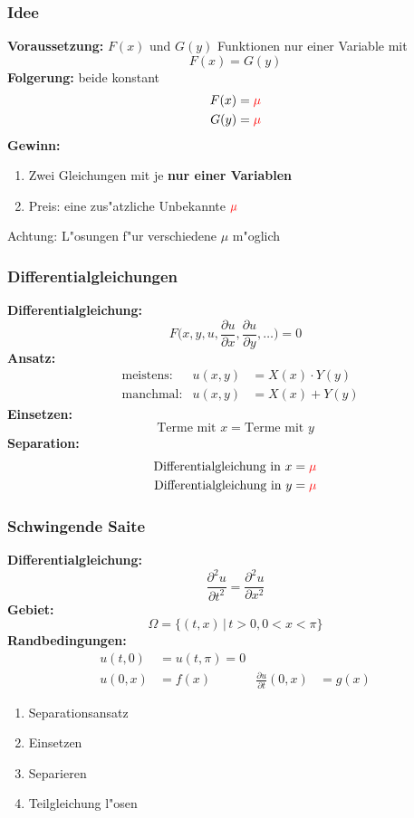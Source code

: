 \begin{frame}
\frametitle{Idee}
{\bf Voraussetzung:}
$F(x)$ und $G(y)$ Funktionen nur einer Variable mit
\[
F(x)=G(y)
\]
\pause
{\bf Folgerung:} beide konstant
\begin{align*}
F(x)&=\color{red}\mu\\
G(y)&=\color{red}\mu
\end{align*}
\pause
{\bf Gewinn:}
\begin{enumerate}
\item Zwei Gleichungen mit je {\bf nur einer Variablen}
\item Preis: eine zus"atzliche Unbekannte $\color{red}\mu$
\end{enumerate}
\pause
Achtung: L"osungen f"ur verschiedene $\mu$ m"oglich
\end{frame}

\begin{frame}
\frametitle{Differentialgleichungen}
{\bf Differentialgleichung:}
\[
F\biggl(x, y, u,
\frac{\partial u}{\partial x},
\frac{\partial u}{\partial y},\dots\biggr)=0
\]
\pause
{\bf Ansatz:}
\begin{align*}
&\text{meistens:}&
u(x,y)&=X(x)\cdot Y(y)\\
&\text{manchmal:}&
u(x,y)&=X(x) + Y(y)
\end{align*}
\pause
{\bf Einsetzen:}
\[
\text{Terme mit $x$} = \text{Terme mit $y$}
\]
\pause
{\bf Separation:}
\begin{align*}
\text{Differentialgleichung in $x$}&= \color{red}\mu\\
\text{Differentialgleichung in $y$}&= \color{red}\mu
\end{align*}
\end{frame}

\begin{frame}
\frametitle{Schwingende Saite}
{\bf Differentialgleichung:}
\[
\frac{\partial^2 u}{\partial t^2}
=
\frac{\partial^2 u}{\partial x^2}
\]
{\bf Gebiet:}
\[
\Omega = \{ (t,x) \,|\, t>0, 0<x<\pi\}
\]
{\bf Randbedingungen:}
\begin{align*}
u(t,0)&=u(t,\pi)=0\\
u(0,x)&=f(x)&\frac{\partial u}{\partial t}(0,x)&=g(x)
\end{align*}
\begin{enumerate}
\pause
\item Separationsansatz
\item Einsetzen
\item Separieren
\item Teilgleichung l"osen
\end{enumerate}
\end{frame}

